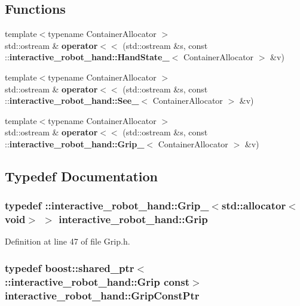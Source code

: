 \subsection*{Functions}
\begin{DoxyCompactItemize}
\item 
{\footnotesize template$<$typename Container\-Allocator $>$ }\\std\-::ostream \& {\bf operator$<$$<$} (std\-::ostream \&s, const \-::{\bf interactive\-\_\-robot\-\_\-hand\-::\-Hand\-State\-\_\-}$<$ Container\-Allocator $>$ \&v)
\item 
{\footnotesize template$<$typename Container\-Allocator $>$ }\\std\-::ostream \& {\bf operator$<$$<$} (std\-::ostream \&s, const \-::{\bf interactive\-\_\-robot\-\_\-hand\-::\-See\-\_\-}$<$ Container\-Allocator $>$ \&v)
\item 
{\footnotesize template$<$typename Container\-Allocator $>$ }\\std\-::ostream \& {\bf operator$<$$<$} (std\-::ostream \&s, const \-::{\bf interactive\-\_\-robot\-\_\-hand\-::\-Grip\-\_\-}$<$ Container\-Allocator $>$ \&v)
\end{DoxyCompactItemize}


\subsection{Typedef Documentation}
\subsubsection[{Grip}]{\setlength{\rightskip}{0pt plus 5cm}typedef \-::{\bf interactive\-\_\-robot\-\_\-hand\-::\-Grip\-\_\-}$<$std\-::allocator$<$void$>$ $>$ {\bf interactive\-\_\-robot\-\_\-hand\-::\-Grip}}\label{namespaceinteractive__robot__hand_ad97183aba2e08ddb07dd90abc77f164d}


Definition at line 47 of file Grip.\-h.

\subsubsection[{Grip\-Const\-Ptr}]{\setlength{\rightskip}{0pt plus 5cm}typedef boost\-::shared\-\_\-ptr$<$ \-::{\bf interactive\-\_\-robot\-\_\-hand\-::\-Grip} const$>$ {\bf interactive\-\_\-robot\-\_\-hand\-::\-Grip\-Const\-Ptr}}\label{namespaceinteractive__robot__hand_a3e329bf4ca3005b74cae144fdeece3cc}


